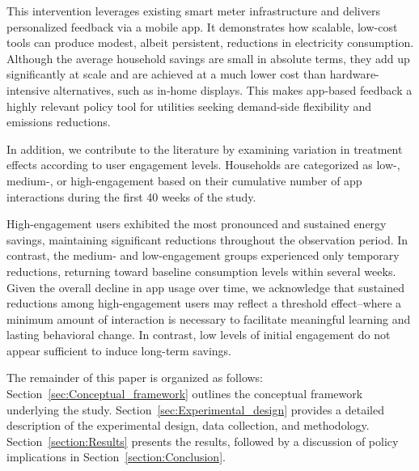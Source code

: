 This intervention leverages existing smart meter infrastructure and delivers personalized feedback via a mobile app. It demonstrates how scalable, low-cost tools can produce modest, albeit persistent, reductions in electricity consumption. Although the average household savings are small in absolute terms, they add up significantly at scale and are achieved at a much lower cost than hardware-intensive alternatives, such as in-home displays. This makes app-based feedback a highly relevant policy tool for utilities seeking demand-side flexibility and emissions reductions.

In addition, we contribute to the literature by examining variation in treatment effects according to user engagement levels.  Households are categorized as low-, medium-, or high-engagement based on their cumulative number of app interactions during the first 40 weeks of the study.

High-engagement users exhibited the most pronounced and sustained energy savings, maintaining significant reductions throughout the observation period. In contrast, the medium- and low-engagement groups experienced only temporary reductions, returning toward baseline consumption levels within several weeks. Given the overall decline in app usage over time, we acknowledge that sustained reductions among high-engagement users may reflect a threshold effect--where a minimum amount of interaction is necessary to facilitate meaningful learning and lasting behavioral change. In contrast, low levels of initial engagement do not appear sufficient to induce long-term savings. 


The remainder of this paper is organized as follows: Section~\ref{sec:Conceptual_framework} outlines the conceptual framework underlying the study. Section~\ref{sec:Experimental_design} provides a detailed description of the experimental design, data collection, and methodology. Section~\ref{section:Results} presents the results, followed by a discussion of policy implications in Section~\ref{section:Conclusion}.  
